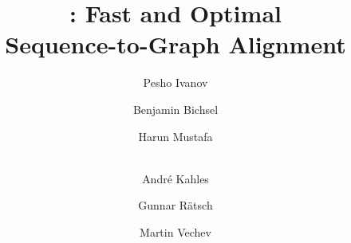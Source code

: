 





\title{\astarix: Fast and Optimal \\Sequence-to-Graph Alignment}

\author{
    Pesho Ivanov \and %
    Benjamin Bichsel \and %
    Harun Mustafa \and \\ %
    Andr\'e Kahles \and %
    Gunnar R{\"a}tsch \and %
    Martin Vechev %
}



\maketitle              















